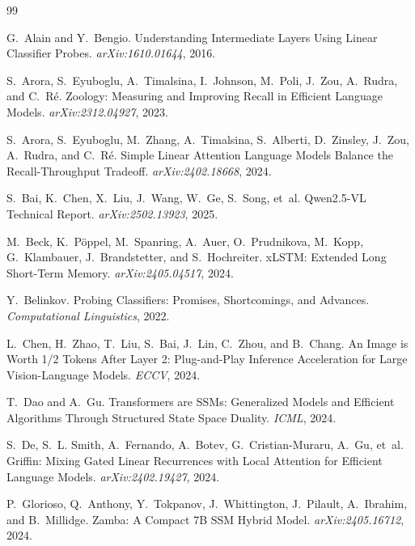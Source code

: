 
\begin{thebibliography}{99}\small\setlength{\itemsep}{1pt}

G.~Alain and Y.~Bengio.
\newblock Understanding Intermediate Layers Using Linear Classifier Probes.
\emph{arXiv:1610.01644}, 2016.

S.~Arora, S.~Eyuboglu, A.~Timalsina, I.~Johnson, M.~Poli, J.~Zou, A.~Rudra,
and C.~R\'e.
\newblock Zoology: Measuring and Improving Recall in Efficient Language Models.
\emph{arXiv:2312.04927}, 2023.

S.~Arora, S.~Eyuboglu, M.~Zhang, A.~Timalsina, S.~Alberti, D.~Zinsley, J.~Zou,
A.~Rudra, and C.~R\'e.
\newblock Simple Linear Attention Language Models Balance the Recall-Throughput
Tradeoff. \emph{arXiv:2402.18668}, 2024.

S.~Bai, K.~Chen, X.~Liu, J.~Wang, W.~Ge, S.~Song, et~al.
\newblock Qwen2.5-VL Technical Report. \emph{arXiv:2502.13923}, 2025.

M.~Beck, K.~P\"oppel, M.~Spanring, A.~Auer, O.~Prudnikova, M.~Kopp,
G.~Klambauer, J.~Brandstetter, and S.~Hochreiter.
\newblock xLSTM: Extended Long Short-Term Memory.
\emph{arXiv:2405.04517}, 2024.

Y.~Belinkov.
\newblock Probing Classifiers: Promises, Shortcomings, and Advances.
\emph{Computational Linguistics}, 2022.

L.~Chen, H.~Zhao, T.~Liu, S.~Bai, J.~Lin, C.~Zhou, and B.~Chang.
\newblock An Image is Worth 1/2 Tokens After Layer 2: Plug-and-Play Inference
Acceleration for Large Vision-Language Models. \emph{ECCV}, 2024.

T.~Dao and A.~Gu.
\newblock Transformers are SSMs: Generalized Models and Efficient Algorithms
Through Structured State Space Duality. \emph{ICML}, 2024.

S.~De, S.~L. Smith, A.~Fernando, A.~Botev, G.~Cristian-Muraru, A.~Gu, et~al.
\newblock Griffin: Mixing Gated Linear Recurrences with Local Attention for
Efficient Language Models. \emph{arXiv:2402.19427}, 2024.

P.~Glorioso, Q.~Anthony, Y.~Tokpanov, J.~Whittington, J.~Pilault, A.~Ibrahim,
and B.~Millidge.
\newblock Zamba: A Compact 7B SSM Hybrid Model.
\emph{arXiv:2405.16712}, 2024.


\end{thebibliography}
